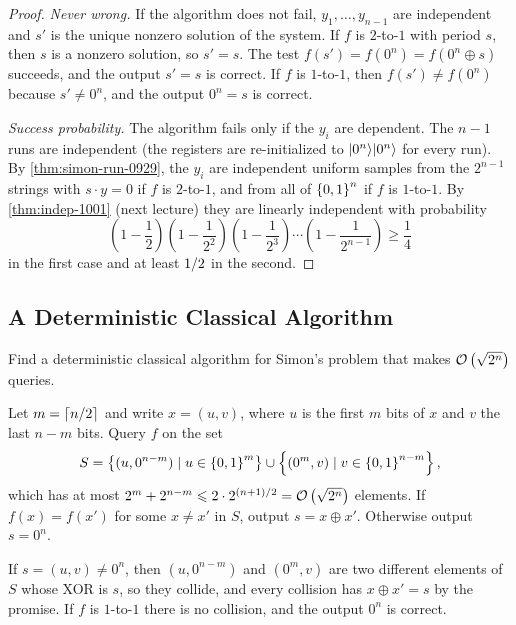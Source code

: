 \begin{proof}
    \emph{Never wrong.} If the algorithm does not fail, $y_1, \dots, y_{n-1}$ are independent and $s'$
    is the unique nonzero solution of the system. If $f$ is $2$-to-$1$ with period $s$, then $s$ is a
    nonzero solution, so $s' = s$. The test $f(s') = f(0^n) = f(0^n \oplus s)$ succeeds, and the output
    $s' = s$ is correct. If $f$ is $1$-to-$1$, then $f(s') \neq f(0^n)$ because $s' \neq 0^n$, and the
    output $0^n = s$ is correct.

    \emph{Success probability.} The algorithm fails only if the $y_i$ are dependent. The $n - 1$ runs are
    independent (the registers are re-initialized to $\lvert 0^n \rangle\lvert 0^n \rangle$ for every run). By
    \cref{thm:simon-run-0929}, the $y_i$ are independent uniform samples from the $2^{n-1}$ strings with
    $s \cdot y = 0$ if $f$ is $2$-to-$1$, and from all of $\left\lbrace0,1\right\rbrace^n$ if $f$ is $1$-to-$1$. By
    \cref{thm:indep-1001} (next lecture) they are linearly independent with probability
    \[\left(1 - \frac{1}{2}\right)\left(1 - \frac{1}{2^2}\right)\left(1 - \frac{1}{2^3}\right) \cdots \left(1 - \frac{1}{2^{n-1}}\right) \geq \frac{1}{4}\]
    in the first case and at least $1/2$ in the second.
\end{proof}

\subsection{A Deterministic Classical Algorithm}

\begin{exercisebox}
\begin{exercise}\label{ex:simon-det-0929}
    Find a deterministic classical algorithm for Simon's problem that makes $\mathcal{O}\left(\sqrt{2^n}\right)$ queries.
\end{exercise}
\tcblower
\begin{wsolution}
    Let $m = \left\lceil n/2\right\rceil$ and write $x = (u, v)$, where $u$ is the first $m$ bits of $x$ and $v$ the
    last $n - m$ bits. Query $f$ on the set
    \[S = \left\lbrace(u, 0^{n-m}) \mid u \in \left\lbrace0,1\right\rbrace^m\right\rbrace \cup \left\lbrace(0^m, v) \mid v \in \left\lbrace0,1\right\rbrace^{n-m}\right\rbrace,\]
    which has at most $2^m + 2^{n-m} \leqslant 2 \cdot 2^{(n+1)/2} = \mathcal{O}\left(\sqrt{2^n}\right)$ elements. If
    $f(x) = f(x')$ for some $x \neq x'$ in $S$, output $s = x \oplus x'$. Otherwise output $s = 0^n$.

    If $s = (u, v) \neq 0^n$, then $(u, 0^{n-m})$ and $(0^m, v)$ are two different elements of $S$
    whose XOR is $s$, so they collide, and every collision has $x \oplus x' = s$ by the promise. If
    $f$ is $1$-to-$1$ there is no collision, and the output $0^n$ is correct.
\end{wsolution}
\end{exercisebox}
